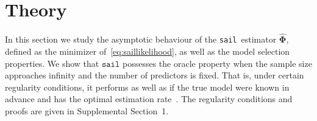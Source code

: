 \documentclass[useAMS,usenatbib,referee]{biom}
\makeatletter
\newcommand{\sail}{\texttt{sail}}
\newcommand{\btheta}{\boldsymbol{\theta}}
\newcommand{\bPhi}{\boldsymbol{\Phi}}
\newcommand{\bPsi}{\boldsymbol{\Psi}}
\DeclareMathOperator*{\argmin}{arg\,min}
\DeclarePairedDelimiter\abs{\lvert}{\rvert}%
\DeclarePairedDelimiter\norm{\lVert}{\rVert}%
\let\oldabs\abs
\def\abs{\@ifstar{\oldabs}{\oldabs*}}
\let\oldnorm\norm
\def\norm{\@ifstar{\oldnorm}{\oldnorm*}}
\makeatother
\begin{document}

\section{Theory} \label{sec:theory}


In this section we study the asymptotic behaviour of the \sail ~estimator $\widehat{\bPhi}$, defined as the minimizer of~\eqref{eq:saillikelihood}, as well as the model selection properties. We show that $\texttt{{sail}}$ possesses the oracle property when the sample size approaches infinity and the number of predictors is fixed. That is, under certain regularity conditions, it performs as well as if the true model were known in advance and has the optimal estimation rate~\citep{zou2006adaptive}. The regularity conditions and proofs are given in Supplemental Section~1. 

\end{document}
